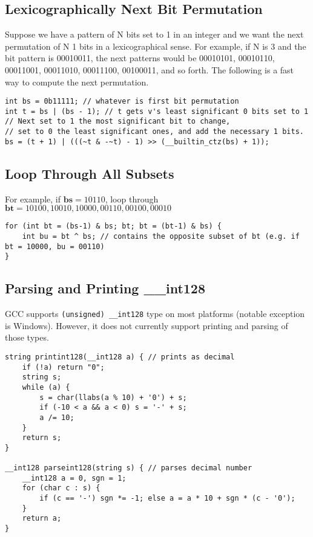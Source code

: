 \documentclass[letterpaper]{article}
\begin{document}
\subsection{Lexicographically Next Bit Permutation}
Suppose we have a pattern of N bits set to 1 in an integer and we want the next permutation of N 1 bits in a lexicographical sense. For example, if N is 3 and the bit pattern is 00010011, the next patterns would be 00010101, 00010110, 00011001, 00011010, 00011100, 00100011, and so forth. The following is a fast way to compute the next permutation.

\begin{lstlisting}
int bs = 0b11111; // whatever is first bit permutation
int t = bs | (bs - 1); // t gets v's least significant 0 bits set to 1
// Next set to 1 the most significant bit to change,
// set to 0 the least significant ones, and add the necessary 1 bits.
bs = (t + 1) | (((~t & -~t) - 1) >> (__builtin_ctz(bs) + 1));
\end{lstlisting}

\subsection{Loop Through All Subsets}
For example, if $\mathbf{bs} = 10110$, loop through $\mathbf{bt} = 10100, 10010, 10000, 00110, 00100, 00010$

\begin{lstlisting}
for (int bt = (bs-1) & bs; bt; bt = (bt-1) & bs) {
	int bu = bt ^ bs; // contains the opposite subset of bt (e.g. if bt = 10000, bu = 00110)
}
\end{lstlisting}

\subsection{Parsing and Printing \_\_int128}
GCC supports \texttt{(unsigned) \_\_int128} type on most platforms (notable exception is Windows). However, it does not currently support printing and parsing of those types.

\begin{lstlisting}
string printint128(__int128 a) { // prints as decimal
	if (!a) return "0";
	string s;
	while (a) {
		s = char(llabs(a % 10) + '0') + s;
		if (-10 < a && a < 0) s = '-' + s;
		a /= 10;
	}
	return s;
}

__int128 parseint128(string s) { // parses decimal number
	__int128 a = 0, sgn = 1;
	for (char c : s) {
		if (c == '-') sgn *= -1; else a = a * 10 + sgn * (c - '0');
	}
	return a;
}
\end{lstlisting}
\end{document}
